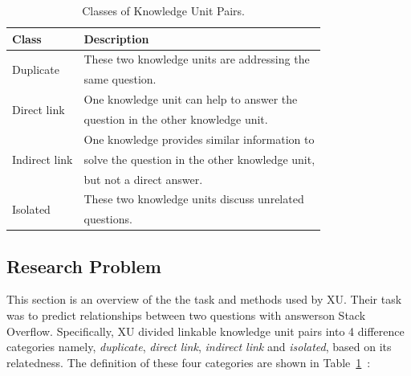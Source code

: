 \documentclass[sigconf]{acmart}
\theoremstyle{break}
\newcommand{\bi}{\begin{itemize}[leftmargin=0.4cm]}
\newcommand{\ei}{\end{itemize}}
\newcommand{\tab}[1]{Table~\ref{tab:#1}}
\begin{document}
\begin{table}[!htp]
\caption{Classes of Knowledge Unit Pairs.}\label{tab:classes}
\centering
\begin{tabular}{l|l}
\hline
\rowcolor{lightgray}
Class & Description  \\\hline
\multirow{2}{*}{Duplicate} & These two knowledge units are addressing the\\
                          & same  question.\\ \hline
\multirow{2}{*}{Direct link}& One knowledge unit can help to  answer the\\ 
                         &  question in the other  knowledge unit.\\ \hline
\multirow{3}{*}{Indirect link}& One knowledge provides similar information to\\
                         &  solve the  question in the other knowledge unit, \\
                         &  but not a direct answer.\\ \hline
\multirow{2}{*}{Isolated}& These two knowledge units discuss unrelated \\
                         & questions.\\ \hline
\end{tabular}
\end{table}


\subsection{Research Problem}\label{problem}


This section is an overview of the the task and methods 
used by XU. Their task was to  predict relationships between two questions with answerson Stack Overflow. Specifically, 
XU  divided linkable knowledge  unit pairs
into 4 difference categories namely, {\it duplicate}, {\it direct link}, {\it indirect link} and {\it isolated}, 
based on its relatedness. The definition of these four categories are shown in \tab{classes}~\cite{xu2016predicting}:


\end{document}
